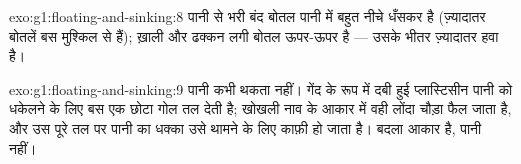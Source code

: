 \begin{solution}{exo:g1:floating-and-sinking:8}
पानी से भरी बंद बोतल पानी में बहुत नीचे धँसकर  है (ज़्यादातर
बोतलें बस मुश्किल से  हैं); ख़ाली और ढक्कन लगी बोतल ऊपर-ऊपर
 है --- उसके भीतर ज़्यादातर हवा है।
\end{solution}

\begin{solution}{exo:g1:floating-and-sinking:9}
पानी कभी थकता नहीं। गेंद के रूप में दबी हुई प्लास्टिसीन पानी को
धकेलने के लिए बस एक छोटा गोल तल देती है; खोखली नाव के आकार में वही
लोंदा चौड़ा फैल जाता है, और उस पूरे तल पर पानी का धक्का उसे थामने के
लिए काफ़ी हो जाता है। बदला आकार है, पानी नहीं।
\end{solution}
